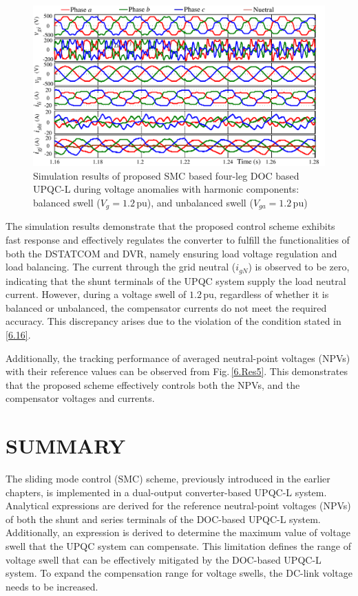 \begin{figure}[]   
	\centering
	\includegraphics[scale=0.8]{figures/Chapter_6/Mine/Res4.pdf}
	\caption{Simulation results of proposed SMC based four-leg DOC based UPQC-L during voltage anomalies with harmonic components: balanced swell ($V_g = 1.2\,$pu), and unbalanced swell ($V_{ga} = 1.2\,$pu)}
	\label{6.Res4}
\end{figure}   

The simulation results demonstrate that the proposed control scheme exhibits fast response and effectively regulates the converter to fulfill the functionalities of both the DSTATCOM and DVR, namely ensuring load voltage regulation and load balancing. The current through the grid neutral ($i_{gN}$) is observed to be zero, indicating that the shunt terminals of the UPQC system supply the load neutral current. However, during a voltage swell of $1.2\,$pu, regardless of whether it is balanced or unbalanced, the compensator currents do not meet the required accuracy. This discrepancy arises due to the violation of the condition stated in \eqref{6.16}.

Additionally, the tracking performance of averaged neutral-point voltages (NPVs) with their reference values can be observed from Fig.\,\ref{6.Res5}. This demonstrates that the proposed scheme effectively controls both the NPVs, and the compensator voltages and currents.
\vspace*{2.5cm}

\section{SUMMARY}
The sliding mode control (SMC) scheme, previously introduced in the earlier chapters, is implemented in a dual-output converter-based UPQC-L system. Analytical expressions are derived for the reference neutral-point voltages (NPVs) of both the shunt and series terminals of the DOC-based UPQC-L system. Additionally, an expression is derived to determine the maximum value of voltage swell that the UPQC system can compensate. This limitation defines the range of voltage swell that can be effectively mitigated by the DOC-based UPQC-L system. To expand the compensation range for voltage swells, the DC-link voltage needs to be increased. 

